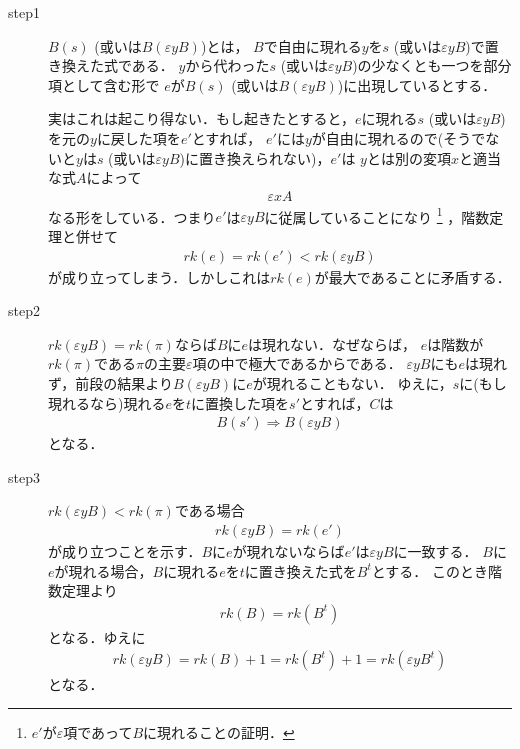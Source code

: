 	\begin{metaprf}\mbox{}
		\begin{description}
			\item[step1]
				$B(s)$ (或いは$B(\varepsilon y B)$)とは，
				$B$で自由に現れる$y$を$s$ (或いは$\varepsilon y B$)で置き換えた式である．
				$y$から代わった$s$ (或いは$\varepsilon y B$)の少なくとも一つを部分項として含む形で
				$e$が$B(s)$ (或いは$B(\varepsilon y B)$)に出現しているとする．
				
				実はこれは起こり得ない．もし起きたとすると，$e$に現れる$s$ (或いは$\varepsilon y B$)
				を元の$y$に戻した項を$e'$とすれば，
				$e'$には$y$が自由に現れるので(そうでないと$y$は$s$
				(或いは$\varepsilon y B$)に置き換えられない)，$e'$は
				$y$とは別の変項$x$と適当な式$A$によって
				\begin{align}
					\varepsilon x A
				\end{align}
				なる形をしている．つまり$e'$は$\varepsilon y B$に従属していることになり
				\footnote{
					$e'$が$\varepsilon$項であって$B$に現れることの証明．
				}
				，階数定理と併せて
				\begin{align}
					rk(e) = rk(e') < rk(\varepsilon y B)
				\end{align}
				が成り立ってしまう．しかしこれは$rk(e)$が最大であることに矛盾する．
				
			\item[step2] $rk(\varepsilon y B) = rk(\pi)$ならば$B$に$e$は現れない．なぜならば，
				$e$は階数が$rk(\pi)$である$\pi$の主要$\varepsilon$項の中で極大であるからである．
				$\varepsilon y B$にも$e$は現れず，前段の結果より$B(\varepsilon y B)$に$e$が現れることもない．
				ゆえに，$s$に(もし現れるなら)現れる$e$を$t$に置換した項を$s'$とすれば，$C$は
				\begin{align}
					B(s') \Longrightarrow B(\varepsilon y B)
				\end{align}
				となる．
			
			\item[step3]
				$rk(\varepsilon y B) < rk(\pi)$である場合
				\begin{align}
					rk(\varepsilon y B) = rk(e')
				\end{align}
				が成り立つことを示す．$B$に$e$が現れないならば$e'$は$\varepsilon y B$に一致する．
				$B$に$e$が現れる場合，$B$に現れる$e$を$t$に置き換えた式を$B^{t}$とする．
				このとき階数定理より
				\begin{align}
					rk(B) = rk(B^{t})
				\end{align}
				となる．ゆえに
				\begin{align}
					rk(\varepsilon y B) = rk(B) + 1 = rk(B^{t}) + 1 = rk(\varepsilon y B^{t})
				\end{align}
				となる．
				\QED
		\end{description}
	\end{metaprf}
	
